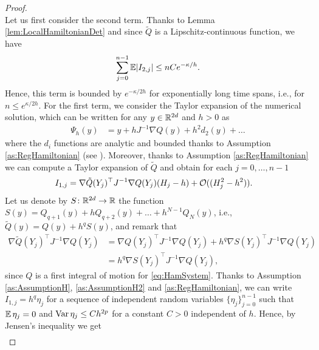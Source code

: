 \documentclass[10pt]{article}
\begin{document}
\begin{proof}
\begin{equation}
\end{equation}
Let us first consider the second term. Thanks to Lemma \ref{lem:LocalHamiltonianDet} and since $\tilde Q$ is a Lipschitz-continuous function, we have
\begin{equation}
	\sum_{j=0}^{n-1} \operatorname{\mathbb{E}} \lvert I_{2,j}\rvert \leq nC e^{-\kappa/h}.
\end{equation}
Hence, this term is bounded by $e^{-\kappa/2h}$ for exponentially long time spans, i.e., for $n \leq e^{\kappa/2h}$. For the first term, we consider the Taylor expansion of the numerical solution, which can be written for any $y \in \mathbb{R}^{2d}$ and $h > 0$ as
\begin{equation}
\begin{aligned}
	\Psi_h(y) &= y + h J^{-1}\nabla Q(y) + h^2 d_2(y) + \ldots
\end{aligned}
\end{equation}
where the $d_i$ functions are analytic and bounded thanks to Assumption \ref{as:RegHamiltonian} (see \cite[Theorem IX.7.2]{HLW06}).  Moreover, thanks to Assumption \ref{as:RegHamiltonian} we can compute a Taylor expansion of $\tilde Q$ and obtain for each $j = 0, \ldots, n-1$
\begin{equation}
\begin{aligned}
	I_{1,j} &= \nabla \tilde Q(Y_j)^\top J^{-1} \nabla Q(Y_j)(H_j - h) + \mathcal{O}((H_j^2 - h^2)).
\end{aligned}
\end{equation}
Let us denote by $S \colon \mathbb{R}^{2d} \to \mathbb{R}$ the function $S(y) = Q_{q+1}(y) + h Q_{q+2}(y) + \ldots + h^{N-1} Q_N(y)$, i.e., $\tilde Q(y) = Q(y) + h^q S(y)$, and remark that
\begin{equation}
\begin{aligned}
	\nabla \tilde Q(Y_j)^\top J^{-1} \nabla Q(Y_j) &= \nabla Q(Y_j)^\top J^{-1} \nabla Q(Y_j) + h^q \nabla S(Y_j)^\top J^{-1} \nabla Q(Y_j) \\
	&= h^q \nabla S(Y_j)^\top J^{-1} \nabla Q(Y_j),
\end{aligned}
\end{equation}
since $Q$ is a first integral of motion for \eqref{eq:HamSystem}. Thanks to Assumption \ref{as:AssumptionH}, \ref{as:AssumptionH2} and \ref{as:RegHamiltonian}, we can write $I_{1, j} = h^q \eta_j$ for a sequence of independent random variables $\{\eta_j\}_{j=0}^{n-1}$ such that $\operatorname{\mathbb{E}} \eta_j = 0$ and $\operatorname{Var} \eta_j \leq Ch^{2p}$ for a constant $C > 0$ independent of $h$. Hence, by Jensen's inequality we get
\begin{equation}
\begin{aligned}

\end{aligned}
\end{equation}
\end{proof}
\end{document}
